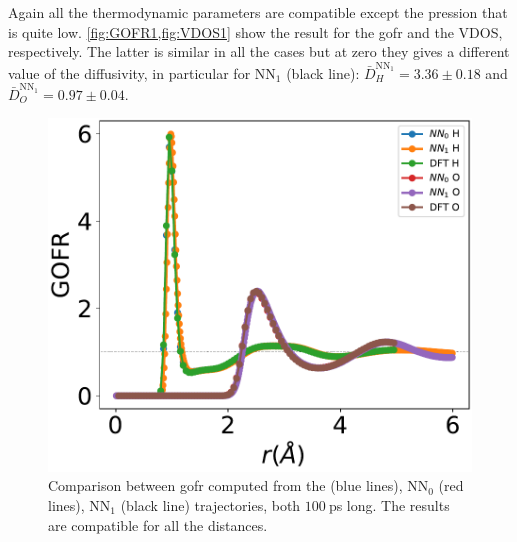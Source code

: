\documentclass[%
 reprint,
 amsmath,amssymb,
 aps,
prb,
]{revtex4-2}
\begin{document}
Again all the thermodynamic parameters are compatible except the pression that is quite low.
\cref{fig:GOFR1,fig:VDOS1} show the result for the gofr and the VDOS, respectively. The latter is similar in all the cases but at zero they gives a different value of the diffusivity, in particular for NN$_1$ (black line): $\bar{D}_{H}^{\text{NN}_1}=3.36 \pm 0.18 $ and $\bar{D}_{O}^{\text{NN}_1}=0.97 \pm 0.04$.
\begin{figure}[tbh]
    \centering
    \includegraphics[width=\linewidth]{figs/GOFR_all.pdf}
    \caption{Comparison between gofr computed from the \ai (blue lines), NN$_0$ (red lines), NN$_1$ (black line) trajectories, both $100~$ps long. The results are compatible for all the distances.} 
    \label{fig:GOFR1}
\end{figure}
\end{document}
